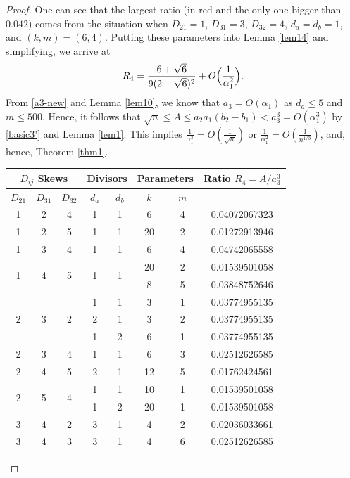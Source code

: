 \documentclass[12pt]{article}
\begin{document}
\begin{proof}
One can see that the largest ratio (in red and the only one bigger than $0.042$) comes from the situation when $D_{21} = 1$, $D_{31} = 3$, $D_{32} = 4$, $d_a = d_b = 1$, and $(k, m) = (6, 4)$. Putting these parameters into Lemma \ref{lem14} and simplifying, we arrive at
\[
R_4 = \frac{6 + \sqrt{6}}{9 (2 + \sqrt{6})^2} + O\Bigl(\frac{1}{\alpha_1^2}\Bigr).
\]
From \eqref{a3-new} and Lemma \ref{lem10}, we know that $a_3 = O(\alpha_1)$ as $d_a \le 5$ and $m \le 500$. Hence, it follows that $\sqrt{n} \le A \le a_2 a_1 (b_2 - b_1) < a_3^3 = O( \alpha_1^3 )$ by \eqref{basic3'} and Lemma \ref{lem1}. This implies $\frac{1}{\alpha_1^3} = O( \frac{1}{\sqrt{n}} )$ or $\frac{1}{\alpha_1^2} = O( \frac{1}{n^{1/3}} )$, and, hence, Theorem \ref{thm1}.
\begin{center}
\begin{tabular}{|c|c|c|c|c|c|c|c|}
\hline
\multicolumn{3}{|c|}{$D_{ij}$ Skews} & \multicolumn{2}{c|}{Divisors} & \multicolumn{2}{c|}{Parameters} & Ratio $R_4 = A / a_3^3$\\
\hline
$D_{21}$ & $D_{31}$ & $D_{32}$ & $d_a$ & $d_b$ & $k$ & $m$ & \\ 
\hline
\hline
1 & 2 & 4 & 1 & 1 & 6 & 4 & 0.04072067323 \\
1 & 2 & 5 & 1 & 1 & 20 & 2 & 0.01272913946 \\
1 & 3 & 4 & 1 & 1 & 6 & 4 & {\color{red}0.04742065558 } \\
\hline
\multirow{2}{*}{1} & \multirow{2}{*}{4} & \multirow{2}{*}{5} & \multirow{2}{*}{1} & \multirow{2}{*}{1} & 20 & 2 & 0.01539501058 \\
 & & & & & 8 & 5 & 0.03848752646 \\
\hline
\multirow{3}{*}{2} & \multirow{3}{*}{3} & \multirow{3}{*}{2} & 1 & 1 & 3 & 1 & 0.03774955135 \\
 & & & 2 & 1 & 3 & 2 & 0.03774955135 \\
 & & & 1 & 2 & 6 & 1 & 0.03774955135 \\
\hline
2 & 3 & 4 & 1 & 1 & 6 & 3 & 0.02512626585 \\
\hline
2 & 4 & 5 & 2 & 1 & 12 & 5 & 0.01762424561 \\
\hline
\multirow{2}{*}{2} & \multirow{2}{*}{5} & \multirow{2}{*}{4} & 1 & 1 & 10 & 1 & 0.01539501058 \\
 & & & 1 & 2 & 20 & 1 & 0.01539501058 \\
\hline
3 & 4 & 2 & 3 & 1 & 4 & 2 & 0.02036033661 \\
\hline
\multirow{4}{*}{3} & \multirow{4}{*}{4} & \multirow{4}{*}{3} & 3 & 1 & 4 & 6 & 0.02512626585 \\

\end{tabular}
\end{center}
\end{proof}
\end{document}
